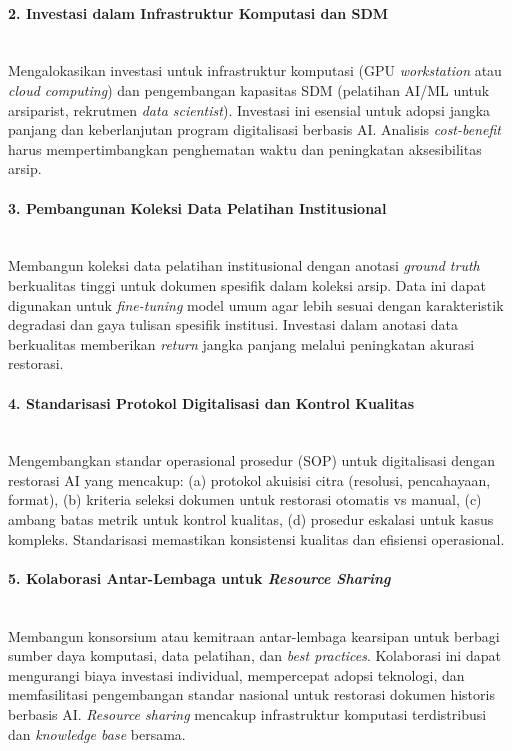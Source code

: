 \documentclass[12pt,a4paper]{article}
\begin{document}
\paragraph{2. Investasi dalam Infrastruktur Komputasi dan SDM} \mbox{}\\[0.1em]
Mengalokasikan investasi untuk infrastruktur komputasi (GPU \textit{workstation} atau \textit{cloud computing}) dan pengembangan kapasitas SDM (pelatihan AI/ML untuk arsiparist, rekrutmen \textit{data scientist}). Investasi ini esensial untuk adopsi jangka panjang dan keberlanjutan program digitalisasi berbasis AI. Analisis \textit{cost-benefit} harus mempertimbangkan penghematan waktu dan peningkatan aksesibilitas arsip.

\paragraph{3. Pembangunan Koleksi Data Pelatihan Institusional} \mbox{}\\[0.1em]
Membangun koleksi data pelatihan institusional dengan anotasi \textit{ground truth} berkualitas tinggi untuk dokumen spesifik dalam koleksi arsip. Data ini dapat digunakan untuk \textit{fine-tuning} model umum agar lebih sesuai dengan karakteristik degradasi dan gaya tulisan spesifik institusi. Investasi dalam anotasi data berkualitas memberikan \textit{return} jangka panjang melalui peningkatan akurasi restorasi.

\paragraph{4. Standarisasi Protokol Digitalisasi dan Kontrol Kualitas} \mbox{}\\[0.1em]
Mengembangkan standar operasional prosedur (SOP) untuk digitalisasi dengan restorasi AI yang mencakup: (a) protokol akuisisi citra (resolusi, pencahayaan, format), (b) kriteria seleksi dokumen untuk restorasi otomatis vs manual, (c) ambang batas metrik untuk kontrol kualitas, (d) prosedur eskalasi untuk kasus kompleks. Standarisasi memastikan konsistensi kualitas dan efisiensi operasional.

\paragraph{5. Kolaborasi Antar-Lembaga untuk \textit{Resource Sharing}} \mbox{}\\[0.1em]
Membangun konsorsium atau kemitraan antar-lembaga kearsipan untuk berbagi sumber daya komputasi, data pelatihan, dan \textit{best practices}. Kolaborasi ini dapat mengurangi biaya investasi individual, mempercepat adopsi teknologi, dan memfasilitasi pengembangan standar nasional untuk restorasi dokumen historis berbasis AI. \textit{Resource sharing} mencakup infrastruktur komputasi terdistribusi dan \textit{knowledge base} bersama.
\end{document}
